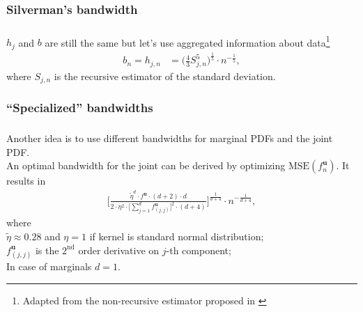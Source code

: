 \documentclass[aspectratio=169]{beamer}
\begin{document}
		\subsubsection{Silverman's bandwidth}
			\begin{frame}
				\frametitle{\insertsubsubsection}
				
				$ h_j $ and $ b $ are still the same but let's use aggregated information about data\footnote{Adapted from the non-recursive estimator proposed in \textcite{Silverman1986}}
				\begin{align}
				b_n = h_{j, n} &= \bigg(\frac{4}{3}S_{j, n}^5\bigg)^{\frac{1}{5}} \cdot n^{-\frac{1}{5}},
				\end{align}
				where $ S_{j,n} $ is the recursive estimator of the standard deviation.
				
			\end{frame}
		
		\subsubsection{``Specialized'' bandwidths}
			\begin{frame}
				\frametitle{\insertsubsubsection}
				
				Another idea is to use different bandwidths for marginal PDFs and the joint PDF.\\[1em]
				
				\onslide<2-> An optimal bandwidth for the joint can be derived by optimizing $ \text{MSE}(f^{\mathbf{u}}_n) $. It results in
				\begin{align}
				\Bigg[\frac{\widetilde{\eta}^d\cdot f^{\mathbf{u}}\cdot(d+2)\cdot d}{2\cdot\eta^2\cdot\big[\sum_{j=1}^{d}f^{\mathbf{u}}_{(j, j)}\big]^2\cdot(d+4)}\Bigg]^{\frac{1}{d+4}} \cdot n^{-\frac{1}{d+4}},
				\end{align}
				where \\[1ex]
				$ \widetilde{\eta} \approx 0.28 $ and $ \eta = 1 $ if kernel is standard normal distribution;\\[0.5ex]
				$ f^\mathbf{u}_{(j,j)} $ is the $ 2^{\text{nd}} $ order derivative on $ j $-th component;\\[0.5ex]
				In case of marginals $ d=1 $.
				
			\end{frame}
			
\end{document}
